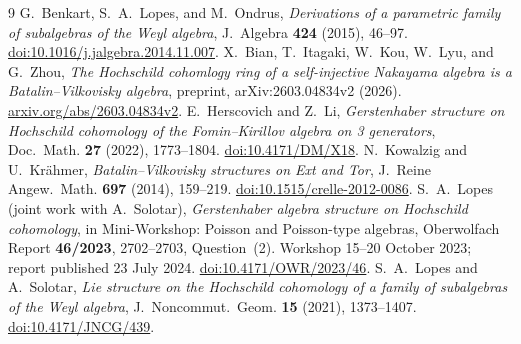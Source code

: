 \documentclass[11pt]{article}
\theoremstyle{remark}\newtheorem{remark}[theorem]{Remark}
\begin{document}
\begin{thebibliography}{9}
G.~Benkart, S.~A.~Lopes, and M.~Ondrus,
\emph{Derivations of a parametric family of subalgebras of the Weyl algebra},
J.~Algebra \textbf{424} (2015), 46--97.
\href{https://doi.org/10.1016/j.jalgebra.2014.11.007}{doi:10.1016/j.jalgebra.2014.11.007}.
X.~Bian, T.~Itagaki, W.~Kou, W.~Lyu, and G.~Zhou,
\emph{The Hochschild cohomlogy ring of a self-injective Nakayama
algebra is a Batalin--Vilkovisky algebra},
preprint, arXiv:2603.04834v2 (2026).
\href{https://arxiv.org/abs/2603.04834v2}{arxiv.org/abs/2603.04834v2}.
E.~Herscovich and Z.~Li,
\emph{Gerstenhaber structure on Hochschild cohomology of the
Fomin--Kirillov algebra on 3 generators},
Doc.~Math. \textbf{27} (2022), 1773--1804.
\href{https://doi.org/10.4171/DM/X18}{doi:10.4171/DM/X18}.
N.~Kowalzig and U.~Kr\"ahmer,
\emph{Batalin--Vilkovisky structures on Ext and Tor},
J.~Reine Angew.~Math. \textbf{697} (2014), 159--219.
\href{https://doi.org/10.1515/crelle-2012-0086}{doi:10.1515/crelle-2012-0086}.
S.~A.~Lopes (joint work with A.~Solotar),
\emph{Gerstenhaber algebra structure on Hochschild cohomology},
in Mini-Workshop: Poisson and Poisson-type algebras,
Oberwolfach Report \textbf{46/2023}, 2702--2703, Question~(2).
Workshop 15--20 October 2023; report published 23 July 2024.
\href{https://doi.org/10.4171/OWR/2023/46}{doi:10.4171/OWR/2023/46}.
S.~A.~Lopes and A.~Solotar,
\emph{Lie structure on the Hochschild cohomology of a family of
subalgebras of the Weyl algebra},
J.~Noncommut.~Geom. \textbf{15} (2021), 1373--1407.
\href{https://doi.org/10.4171/JNCG/439}{doi:10.4171/JNCG/439}.
\end{thebibliography}
\end{document}
